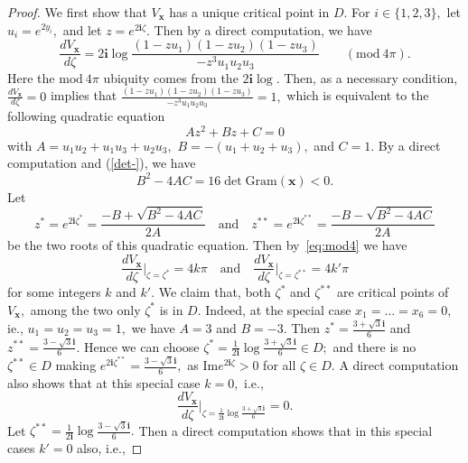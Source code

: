 \documentclass[11pt]{article}
\theoremstyle{remark}
\theoremstyle{remark}
\numberwithin{equation}{section}
\begin{document}
\begin{proof} We first show that $V_{\boldsymbol x}$ has a unique  critical point in $D.$  For $i\in\{1,2,3\},$ let $u_i=e^{2y_i},$ and let $z=e^{2\mathbf i\zeta}.$ Then by a direct computation, we have
\begin{equation}\label{eq:mod4}
\frac{d V_{\boldsymbol x}}{d \zeta}=2\mathbf i\log\frac{(1-zu_1)(1-zu_2)(1-zu_3)}{-z^3u_1u_2u_3}\quad\quad (\mathrm{mod}\ 4\pi).
\end{equation} 
Here the $\mathrm{mod}\ 4\pi$ ubiquity  comes from the  $2\mathbf i\log.$ Then, as a necessary condition, $\frac{d V_{\boldsymbol x}}{d \zeta}=0$ implies that 
$\frac{(1-zu_1)(1-zu_2)(1-zu_3)}{-z^3u_1u_2u_3}=1,$ which is equivalent to the following quadratic equation 
$$Az^2+Bz+C=0$$
with $A=u_1u_2+u_1u_3+u_2u_3,$ $B=-(u_1+u_2+u_3),$ and $C=1.$
By a direct computation and (\ref{det-}), we have 
\begin{equation}\label{detGram}
    B^2-4AC = 16\det\mathrm{Gram}(\boldsymbol x)<0.
\end{equation}
Let 
\begin{equation}\label{xi}
z^*=e^{2\mathbf i\zeta^*}=\frac{-B+\sqrt{B^2-4AC}}{2A}\quad\text{and}\quad {z^{**}}=e^{2\mathbf i{\zeta^{**}}}=\frac{-B-\sqrt{B^2-4AC}}{2A}
\end{equation}
be the two roots of this quadratic equation. Then by~\eqref{eq:mod4} we have 
\begin{equation}\label{kk'}
    \frac{d V_{\boldsymbol x}}{d \zeta}\Big|_{\zeta=\zeta^*}=4k\pi\quad\text{and}\quad\frac{d V_{\boldsymbol x}}{d \zeta}\Big|_{\zeta={\zeta^{**}}}=4k'\pi
\end{equation}
for some integers $k$ and $k'.$ We claim that, both $\zeta^*$ and $\zeta^{**}$ are  critical points of $V_{\boldsymbol x},$ among the two only $\zeta^*$ is in $D.$   Indeed, at the special case $x_1=\dots=x_6=0,$ ie., $u_1=u_2=u_3=1,$ we have 
$A=3$ and $B=-3.$ Then $z^*=\frac{3+\sqrt{3}\mathbf i}{6}$ and ${z^{**}}=\frac{3-\sqrt{3}\mathbf i}{6}.$ Hence we can choose $\zeta^*=\frac{1}{2\mathbf i}\log \frac{3+\sqrt{3}\mathbf i}{6}\in D;$ and  there is no ${\zeta^{**}}\in D$ making $e^{2\mathbf i{\zeta^{**}}}=\frac{3-\sqrt{3}\mathbf i}{6},$ as $\mathrm{Im}e^{2\mathbf i\zeta}>0$ for all $\zeta\in D.$ A direct computation also shows that at this special case $k=0,$ i.e.,
$$\frac{d V_{\boldsymbol x}}{d\zeta}\Big|_{\zeta=\frac{1}{2\mathbf i}\log \frac{3+\sqrt{3}\mathbf i}{6}}=0.$$ 
Let $\zeta^{**}=\frac{1}{2\mathbf i}\log \frac{3-\sqrt{3}\mathbf i}{6}.$ Then a direct computation shows that  in this special cases $k'=0$ also, i.e.,

\end{proof}
\end{document}
